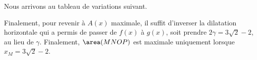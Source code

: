 Nous arrivons au tableau de variations suivant.

\begin{center}
\end{center}

Finalement,
pour revenir à $A(x)$ maximale, il suffit d'inverser la dilatation horizontale qui a permis de passer de $f(x)$ à $g(x)$, soit prendre $2 \gamma = 3 \sqrt{2} - 2$, au lieu de $\gamma$.
%
Finalement,
$\area(MNOP)$ est maximale uniquement lorsque $x_M = 3 \sqrt{2} - 2$.
